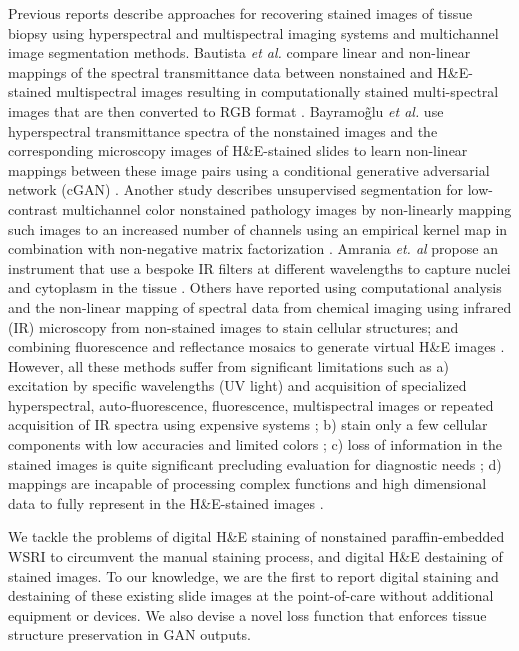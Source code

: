 \documentclass[10pt, conference, compsocconf]{IEEEtran}
\begin{document}
Previous reports describe approaches for recovering stained images of tissue biopsy using hyperspectral and multispectral imaging systems and multichannel image segmentation methods. Bautista \textit{et al.} compare linear and non-linear mappings of the spectral transmittance data between nonstained and H\&E-stained multispectral images resulting in computationally stained multi-spectral images that are then converted to RGB format \cite{bautista}. Bayramo\~glu \textit{et al.} use hyperspectral transmittance spectra of the nonstained images and the corresponding microscopy images of H\&E-stained slides to learn non-linear mappings between these image pairs using a conditional generative adversarial network (cGAN) \cite{bayramoglu}. Another study describes unsupervised segmentation for low-contrast multichannel color nonstained pathology images by non-linearly mapping such images to an increased number of channels using an empirical kernel map in combination with non-negative matrix factorization \cite{kopriva2015unsupervised}. Amrania \textit{et. al} propose an instrument that use a bespoke IR filters at different wavelengths to capture nuclei and cytoplasm in the tissue \cite{amrania2012digistain}. Others have reported using computational analysis and the non-linear mapping of spectral data from chemical imaging using infrared (IR) microscopy from non-stained images to stain cellular structures; and combining fluorescence and reflectance mosaics to generate virtual H\&E images \cite{mayerich2015stain,bini2011confocal}. However, all these methods suffer from significant limitations such as a) excitation by specific wavelengths (UV light) and acquisition of specialized hyperspectral, auto-fluorescence, fluorescence, multispectral images or repeated acquisition of IR spectra using expensive systems \cite{bautista,bayramoglu,kopriva2015unsupervised,mayerich2015stain,rivenson2018deep}; b) stain only a few cellular components with low accuracies and limited colors \cite{bautista}; c) loss of information in the stained images is quite significant precluding evaluation for diagnostic needs \cite{bayramoglu}; d) mappings are incapable of processing complex functions and high dimensional data to fully represent in the H\&E-stained images \cite{bautista,kopriva2015unsupervised,mayerich2015stain}.

We tackle the problems of digital H\&E staining of nonstained paraffin-embedded WSRI to circumvent the manual staining process, and digital H\&E destaining of stained images. To our knowledge, we are the first to report digital staining and destaining of these existing slide images at the point-of-care without additional equipment or devices. We also devise a novel loss function that enforces tissue structure preservation in GAN outputs.
\end{document}
